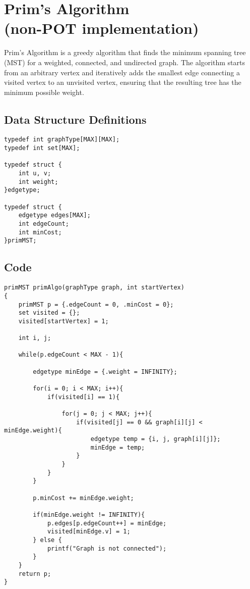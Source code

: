 \documentclass{book}
\begin{document}
\newpage


\twocolumn
\section{Prim's Algorithm\\(non-POT implementation)}

Prim's Algorithm is a greedy algorithm that finds the minimum spanning tree (MST) for a weighted, connected, and undirected graph. The algorithm starts from an arbitrary vertex and iteratively adds the smallest edge connecting a visited vertex to an unvisited vertex, ensuring that the resulting tree has the minimum possible weight.
\subsection{Data Structure Definitions}

\begin{verbatim}
typedef int graphType[MAX][MAX];
typedef int set[MAX]; 

typedef struct {
	int u, v; 
	int weight;
}edgetype;

typedef struct {
    edgetype edges[MAX];
    int edgeCount;
	int minCost;
}primMST;
\end{verbatim}

\newpage

\subsection{Code}
\begin{verbatim}
primMST primAlgo(graphType graph, int startVertex)
{
	primMST p = {.edgeCount = 0, .minCost = 0};
	set visited = {};
	visited[startVertex] = 1;

	int i, j;

	while(p.edgeCount < MAX - 1){
		
		edgetype minEdge = {.weight = INFINITY};

		for(i = 0; i < MAX; i++){
			if(visited[i] == 1){
			
				for(j = 0; j < MAX; j++){
					if(visited[j] == 0 && graph[i][j] < minEdge.weight){
						edgetype temp = {i, j, graph[i][j]};
						minEdge = temp;
					}
				}
			}
		}

		p.minCost += minEdge.weight;
		
		if(minEdge.weight != INFINITY){
			p.edges[p.edgeCount++] = minEdge;
			visited[minEdge.v] = 1;
		} else {
			printf("Graph is not connected");
		}
	}
	return p;
}
\end{verbatim}
\end{document}
